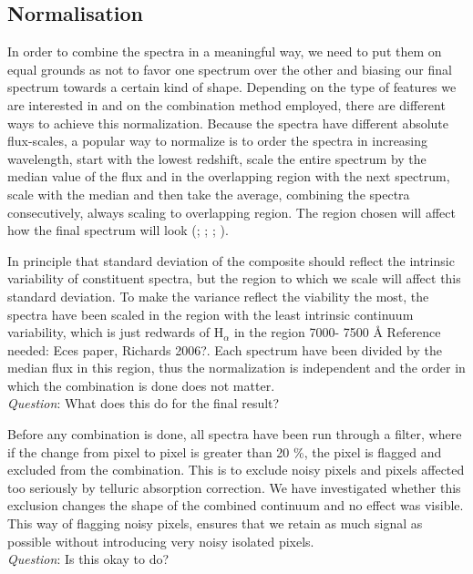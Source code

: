 \documentclass{aa}    %
\newcommand{\sectlabel}[1]{\label{sect:#1}}
\newcommand{\todo}[3]{{\color{#2}\emph{#1}: #3}}
\newcommand{\qtodo}[1]{\todo{\\ Question}{red}{#1}}
\begin{document}
\subsection{Normalisation}  \sectlabel{norm}

In order to combine the spectra in a meaningful way, we need to put them on equal grounds as not to favor one spectrum over the other and biasing our final spectrum towards a certain kind of shape. Depending on the type of features we are interested in and on the combination method employed, there are different ways to achieve this normalization. Because the spectra have different absolute flux-scales, a popular way to normalize is to order the spectra in increasing wavelength, start with the lowest redshift, scale the entire spectrum by the median value of the flux and in the overlapping region with the next spectrum, scale with the median and then take the average, combining the spectra consecutively, always scaling to overlapping region. The region chosen will affect how the final spectrum will look (\cite{Francis1991}; \cite{Brotherton2000}; \cite{VandenBerk2001}; \cite{Glikman2006}).

 In principle that standard deviation of the composite should reflect the intrinsic variability of constituent spectra, but the region to which we scale will affect this standard deviation. To make the variance reflect the viability the most, the spectra have been scaled in the region with the least intrinsic continuum variability, which is just redwards of H$_\alpha$ in the region 7000- 7500 \r{A} {\color{red} Reference needed:  Eces paper, Richards 2006?}. Each spectrum have been divided by the median flux in this region, thus the normalization is independent and the order in which the combination is done does not matter. \qtodo{What does this do for the final result?}

Before any combination is done, all spectra have been run through a filter, where if the change from pixel to pixel is greater than 20 \%, the pixel is flagged and excluded from the combination. This is to exclude noisy pixels and pixels affected too seriously by telluric absorption correction. We have investigated whether this exclusion changes the shape of the combined continuum and no effect was visible. This way of flagging noisy pixels, ensures that we retain as much signal as possible without introducing very noisy isolated pixels. \qtodo{Is this okay to do?}
\end{document}
